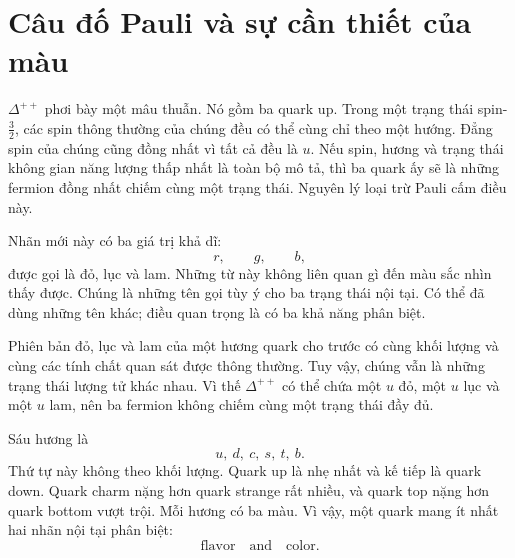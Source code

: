 \begin{classroomqa}
\end{classroomqa}

\section{Câu đố Pauli và sự cần thiết của màu}

\(\Delta^{++}\) phơi bày một mâu thuẫn. Nó gồm ba quark up. Trong một trạng thái spin-\(\tfrac32\), các spin thông thường của chúng đều có thể cùng chỉ theo một hướng. Đẳng spin của chúng cũng đồng nhất vì tất cả đều là \(u\). Nếu spin, hương và trạng thái không gian năng lượng thấp nhất là toàn bộ mô tả, thì ba quark ấy sẽ là những fermion đồng nhất chiếm cùng một trạng thái. Nguyên lý loại trừ Pauli cấm điều này.

\begin{classroomqa}
\end{classroomqa}

Nhãn mới này có ba giá trị khả dĩ:
\begin{equation}
r,\qquad g,\qquad b,
\end{equation}
được gọi là đỏ, lục và lam. Những từ này không liên quan gì đến màu sắc nhìn thấy được. Chúng là những tên gọi tùy ý cho ba trạng thái nội tại. Có thể đã dùng những tên khác; điều quan trọng là có ba khả năng phân biệt.

Phiên bản đỏ, lục và lam của một hương quark cho trước có cùng khối lượng và cùng các tính chất quan sát được thông thường. Tuy vậy, chúng vẫn là những trạng thái lượng tử khác nhau. Vì thế \(\Delta^{++}\) có thể chứa một \(u\) đỏ, một \(u\) lục và một \(u\) lam, nên ba fermion không chiếm cùng một trạng thái đầy đủ.

Sáu hương là
\begin{equation}
u,\ d,\ c,\ s,\ t,\ b.
\end{equation}
Thứ tự này không theo khối lượng. Quark up là nhẹ nhất và kế tiếp là quark down. Quark charm nặng hơn quark strange rất nhiều, và quark top nặng hơn quark bottom vượt trội. Mỗi hương có ba màu. Vì vậy, một quark mang ít nhất hai nhãn nội tại phân biệt:
\begin{equation}
\text{flavor}\quad\text{and}\quad\text{color}.
\end{equation}

